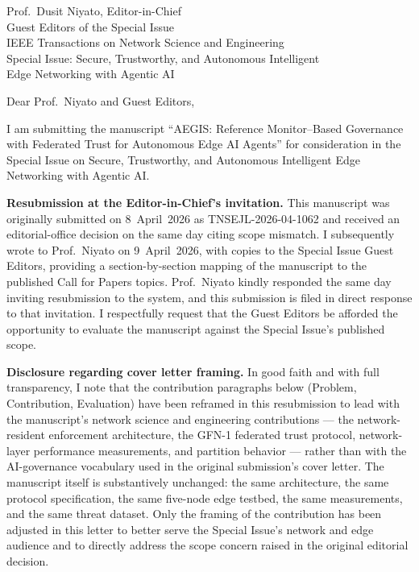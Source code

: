 \documentclass[11pt]{letter}
\begin{document}
\begin{letter}{Prof.\ Dusit Niyato, Editor-in-Chief\\Guest Editors of the Special Issue\\IEEE Transactions on Network Science and Engineering\\Special Issue: Secure, Trustworthy, and Autonomous Intelligent\\Edge Networking with Agentic AI}

\opening{Dear Prof.\ Niyato and Guest Editors,}

I am submitting the manuscript ``AEGIS: Reference Monitor--Based Governance with Federated Trust for Autonomous Edge AI Agents'' for consideration in the Special Issue on Secure, Trustworthy, and Autonomous Intelligent Edge Networking with Agentic AI.

\textbf{Resubmission at the Editor-in-Chief's invitation.} This manuscript was originally submitted on 8~April~2026 as TNSEJL-2026-04-1062 and received an editorial-office decision on the same day citing scope mismatch. I subsequently wrote to Prof.\ Niyato on 9~April~2026, with copies to the Special Issue Guest Editors, providing a section-by-section mapping of the manuscript to the published Call for Papers topics. Prof.\ Niyato kindly responded the same day inviting resubmission to the system, and this submission is filed in direct response to that invitation. I respectfully request that the Guest Editors be afforded the opportunity to evaluate the manuscript against the Special Issue's published scope.

\textbf{Disclosure regarding cover letter framing.} In good faith and with full transparency, I note that the contribution paragraphs below (Problem, Contribution, Evaluation) have been reframed in this resubmission to lead with the manuscript's network science and engineering contributions --- the network-resident enforcement architecture, the GFN-1 federated trust protocol, network-layer performance measurements, and partition behavior --- rather than with the AI-governance vocabulary used in the original submission's cover letter. The manuscript itself is substantively unchanged: the same architecture, the same protocol specification, the same five-node edge testbed, the same measurements, and the same threat dataset. Only the framing of the contribution has been adjusted in this letter to better serve the Special Issue's network and edge audience and to directly address the scope concern raised in the original editorial decision.


\end{letter}
\end{document}
